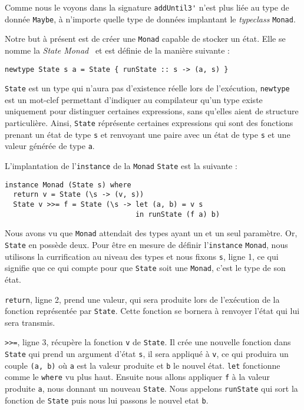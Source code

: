 \documentclass{llncs}
\begin{document}
Comme nous le voyons dans la signature \lstinline{addUntil3'} n'est plus liée au type
de donnée \lstinline{Maybe}, à n'importe quelle type de données implantant le \emph{typeclass}
\lstinline{Monad}.

Notre but à présent est de créer une \lstinline{Monad} capable de stocker un état.
Elle se nomme la \emph{State Monad}~\cite{PeytonJones95} et est définie de la manière
suivante :
\begin{lstlisting}
newtype State s a = State { runState :: s -> (a, s) }
\end{lstlisting}
\lstinline{State} est un type qui n'aura pas d'existence réelle lors de l'exécution,
\lstinline{newtype} est un mot-clef permettant d'indiquer au compilateur qu'un type
existe uniquement pour distinguer certaines expressions, sans qu'elles aient de
structure particulière.
Ainsi, \lstinline{State} réprésente certaines expressions qui sont des fonctions
prenant un état de type \lstinline{s} et renvoyant une paire avec un état
de type \lstinline{s} et une valeur générée de type \lstinline{a}.

L'implantation de l'\lstinline{instance} de la \lstinline{Monad} \lstinline{State}
est la suivante :
\begin{lstlisting}
instance Monad (State s) where
  return v = State (\s -> (v, s))
  State v >>= f = State (\s -> let (a, b) = v s
                               in runState (f a) b)
\end{lstlisting}

Nous avons vu que \lstinline{Monad} attendait des types ayant un et un seul paramètre.
Or, \lstinline{State} en possède deux.
Pour être en mesure de définir l'\lstinline{instance} \lstinline{Monad},
nous utilisons la currification au niveau des types et nous fixons \lstinline{s},
ligne 1, ce qui signifie que ce qui compte pour que \lstinline{State} soit une \lstinline{Monad},
c'est le type de son état.

\lstinline{return}, ligne 2, prend une valeur, qui sera produite lors de
l'exécution de la fonction représentée par \lstinline{State}.
Cette fonction se bornera à renvoyer l'état qui lui sera transmis.

\lstinline{>>=}, ligne 3, récupère la fonction \lstinline{v} de \lstinline{State}.
Il crée une nouvelle fonction dans \lstinline{State} qui prend
un argument d'état \lstinline{s}, il sera appliqué à \lstinline{v}, ce qui
produira un couple \lstinline{(a, b)} où \lstinline{a} est la valeur produite
et  \lstinline{b} le nouvel état.
\lstinline{let} fonctionne comme le \lstinline{where} vu plus haut.
Ensuite nous allons appliquer \lstinline{f} à la valeur produite \lstinline{a},
nous donnant un nouveau \lstinline{State}.
Nous appelons \lstinline{runState} qui sort la fonction de \lstinline{State}
puis nous lui passons le nouvel etat \lstinline{b}.
\end{document}
